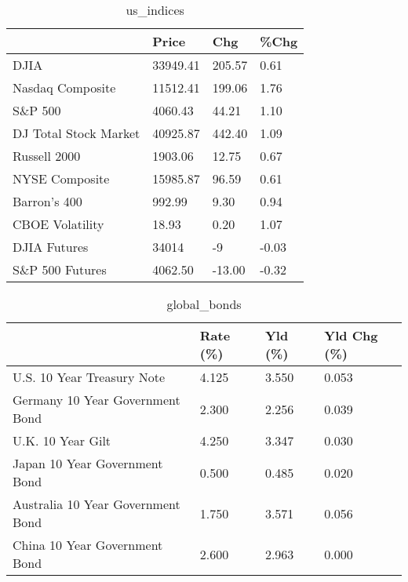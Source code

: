 \documentclass{article}%
\begin{document}
%


\begin{table}[htbp]%
\caption{us\_indices}%
\centering%
\begin{adjustbox}{width=1\textwidth}%
\begin{tabular}{llll}
\toprule
                      &    Price &    Chg &  \%Chg \\
\midrule
                 DJIA & 33949.41 & 205.57 &  0.61 \\
     Nasdaq Composite & 11512.41 & 199.06 &  1.76 \\
              S\&P 500 &  4060.43 &  44.21 &  1.10 \\
DJ Total Stock Market & 40925.87 & 442.40 &  1.09 \\
         Russell 2000 &  1903.06 &  12.75 &  0.67 \\
       NYSE Composite & 15985.87 &  96.59 &  0.61 \\
         Barron's 400 &   992.99 &   9.30 &  0.94 \\
      CBOE Volatility &    18.93 &   0.20 &  1.07 \\
         DJIA Futures &    34014 &     -9 & -0.03 \\
      S\&P 500 Futures &  4062.50 & -13.00 & -0.32 \\
\bottomrule
\end{tabular}
%
\end{adjustbox}%
\end{table}

%


\begin{table}[htbp]%
\caption{global\_bonds}%
\centering%
\begin{adjustbox}{width=1\textwidth}%
\begin{tabular}{llll}
\toprule
                                  & Rate (\%) & Yld (\%) & Yld Chg (\%) \\
\midrule
       U.S. 10 Year Treasury Note &    4.125 &   3.550 &       0.053 \\
  Germany 10 Year Government Bond &    2.300 &   2.256 &       0.039 \\
                U.K. 10 Year Gilt &    4.250 &   3.347 &       0.030 \\
    Japan 10 Year Government Bond &    0.500 &   0.485 &       0.020 \\
Australia 10 Year Government Bond &    1.750 &   3.571 &       0.056 \\
    China 10 Year Government Bond &    2.600 &   2.963 &       0.000 \\
\bottomrule
\end{tabular}
%
\end{adjustbox}%
\end{table}
\end{document}
